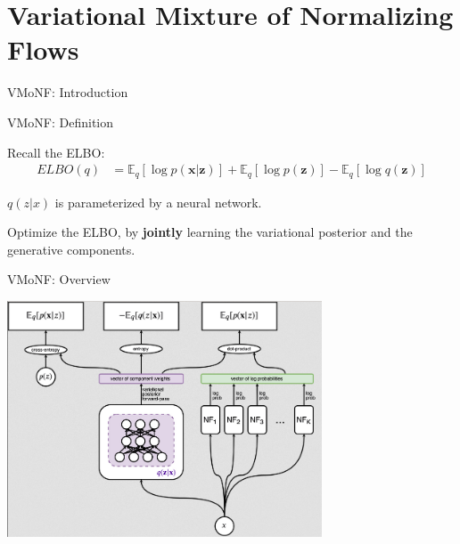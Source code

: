 \documentclass{beamer}
\begin{document}
\hypertarget{variational-mixture-of-normalizing-flows}{%
\section{Variational Mixture of Normalizing
Flows}\label{variational-mixture-of-normalizing-flows}}

\begin{frame}{VMoNF: Introduction}
\protect\hypertarget{vmonf-introduction}{}


\end{frame}

\begin{frame}{VMoNF: Definition}
\protect\hypertarget{vmonf-definition}{}

Recall the ELBO: \begin{align*}
    ELBO(q) &= \mathbb{E}_q [\log p(\bm{x}|\bm{z})] + \mathbb{E}_q [\log p(\bm{z})] - \mathbb{E}_q [\log q(\bm{z})]
\end{align*}

\pause

\(q(z|x)\) is parameterized by a neural network.

\pause

Optimize the ELBO, by \textbf{jointly} learning the variational
posterior and the generative components.

\end{frame}

\begin{frame}{VMoNF: Overview}
\protect\hypertarget{vmonf-overview}{}

\centering

\includegraphics[width=0.7\textwidth]{figures/train_overview.png}

\end{frame}
\end{document}
